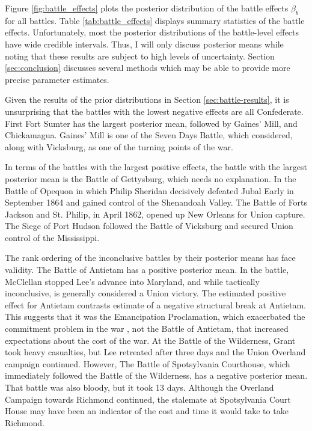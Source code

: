 \documentclass[11pt, oneside, article]{memoir}
\begin{document}
Figure \ref{fig:battle_effects} plots the posterior distribution of the battle effects $\beta_{b}$ for all battles.
Table \ref{tab:battle_effects} displays summary statistics of the battle effects.
Unfortunately, most the posterior distributions of the battle-level effects have wide credible intervals.
Thus, I will only discuss posterior means while noting that these results are subject to high levels of uncertainty.
Section \ref{sec:conclusion} discusses several methods which may be able to provide more precise parameter estimates.

Given the results of the prior distributions in Section \ref{sec:battle-results}, it is unsurprising that the battles with the lowest negative effects are all Confederate.
First Fort Sumter has the largest posterior mean, followed by Gaines' Mill, and Chickamagua.
Gaines' Mill is one of the Seven Days Battle, which \textcite{Fuller1956} considered, along with Vicksburg, as one of the turning points of the war.

In terms of the battles with the largest positive effects, the battle with the largest posterior mean is the Battle of Gettysburg, which needs no explanation. 
In the Battle of Opequon in which Philip Sheridan decisively defeated Jubal Early in September 1864 and gained control of the Shenandoah Valley.
The Battle of Forts Jackson and St. Philip, in April 1862, opened up New Orleans for Union capture.
The Siege of Port Hudson followed the Battle of Vicksburg and secured Union control of the Mississippi.

The rank ordering of the inconclusive battles by their posterior means has face validity.
The Battle of Antietam has a positive posterior mean.
In the battle, McClellan stopped Lee's advance into Maryland, and while tactically inconclusive, is generally considered a Union victory.
The estimated positive effect for Antietam contrasts \textcite{WillardGuinnaneEtAl1996} estimate of a negative structural break at Antietam.
This suggests that it was the Emancipation Proclamation, which exacerbated the commitment problem in the war \textcite{Reiter2009}, not the Battle of Antietam, that increased expectations about the cost of the war.
At the Battle of the Wilderness, Grant took heavy casualties, but Lee retreated after three days and the Union Overland campaign continued.
However, The Battle of Spotsylvania Courthouse, which immediately followed the Battle of the Wilderness, has a negative posterior mean.
That battle was also bloody, but it took 13 days.
Although the Overland Campaign towards Richmond continued, the stalemate at Spotsylvania Court House may have been an indicator of the cost and time it would take to take Richmond.
\end{document}
